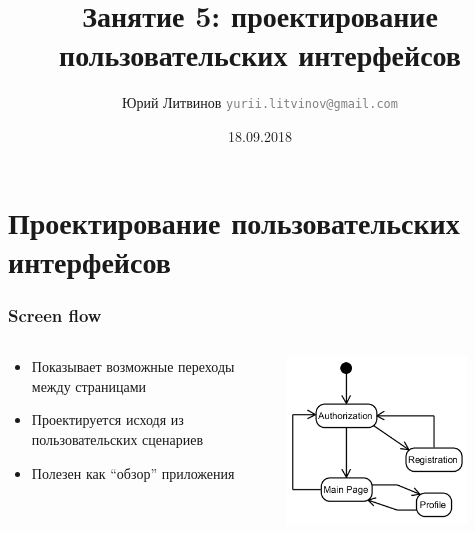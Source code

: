 \documentclass[xetex,mathserif,serif]{beamer}
\title{Занятие 5: проектирование пользовательских интерфейсов}
\author[Юрий Литвинов]{Юрий Литвинов \newline \textcolor{gray}{\small\texttt{yurii.litvinov@gmail.com}}}
\date{18.09.2018}
\begin{document}
	\frame{\titlepage}
	\section{Проектирование пользовательских интерфейсов}
	
	\begin{frame}
		\frametitle{Screen flow}
		\begin{columns}
			\begin{column}{0.6\textwidth}
				\begin{itemize}
					\item Показывает возможные переходы между страницами
					\item Проектируется исходя из пользовательских сценариев
					\item Полезен как ``обзор'' приложения
				\end{itemize}
			\end{column}
			\begin{column}{0.4\textwidth}
				\begin{center}
					\includegraphics[width=0.8\textwidth]{screenFlow.png}
				\end{center}
			\end{column}
		\end{columns}
	\end{frame}
\end{document}
